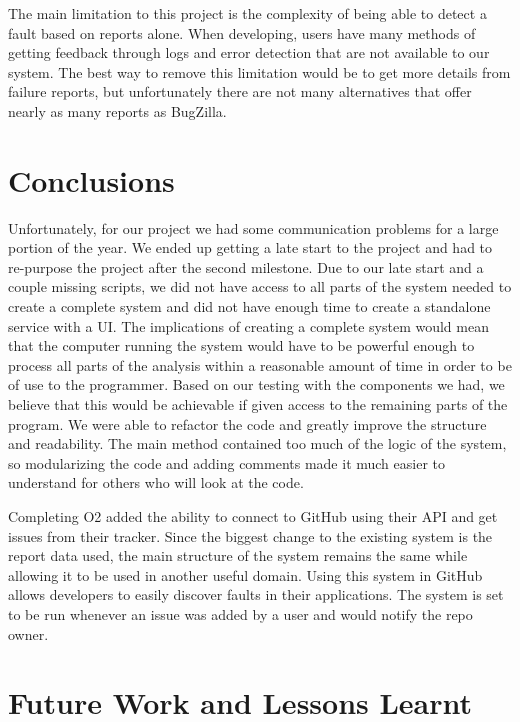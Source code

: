 \documentclass[12pt]{article}
\begin{document}
The main limitation to this project is the complexity of being able to
detect a fault based on reports alone. When developing, users have many
methods of getting feedback through logs and error detection that are
not available to our system. The best way to remove this limitation
would be to get more details from failure reports, but unfortunately
there are not many alternatives that offer nearly as many reports as
BugZilla.

\hypertarget{conclusions}{%
\section{Conclusions}\label{conclusions}}

Unfortunately, for our project we had some communication problems for a
large portion of the year. We ended up getting a late start to the
project and had to re-purpose the project after the second milestone.
Due to our late start and a couple missing scripts, we did not have
access to all parts of the system needed to create a complete system and
did not have enough time to create a standalone service with a UI. The
implications of creating a complete system would mean that the computer
running the system would have to be powerful enough to process all parts
of the analysis within a reasonable amount of time in order to be of use
to the programmer. Based on our testing with the components we had, we
believe that this would be achievable if given access to the remaining
parts of the program. We were able to refactor the code and greatly
improve the structure and readability. The main method contained too
much of the logic of the system, so modularizing the code and adding
comments made it much easier to understand for others who will look at
the code.

Completing O2 added the ability to connect to GitHub using their API and
get issues from their tracker. Since the biggest change to the existing
system is the report data used, the main structure of the system remains
the same while allowing it to be used in another useful domain. Using
this system in GitHub allows developers to easily discover faults in
their applications. The system is set to be run whenever an issue was
added by a user and would notify the repo owner.

\hypertarget{future-work-and-lessons-learnt}{%
\section{Future Work and Lessons
Learnt}\label{future-work-and-lessons-learnt}}
\end{document}
